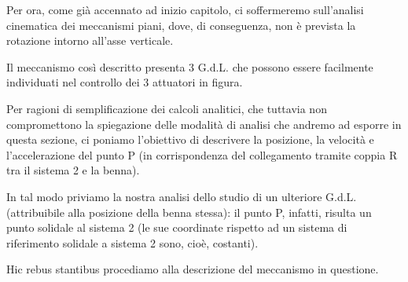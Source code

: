 			Per ora, come già accennato ad inizio capitolo, ci soffermeremo sull'analisi cinematica dei meccanismi piani, dove, di conseguenza, non è prevista la rotazione intorno all'asse verticale.
			
			Il meccanismo così descritto presenta 3 G.d.L. che possono essere facilmente individuati nel controllo dei 3 attuatori in figura.
			
			Per ragioni di semplificazione dei calcoli analitici, che tuttavia non compromettono la spiegazione delle modalità di analisi che andremo ad esporre in questa sezione, ci poniamo l'obiettivo di descrivere la posizione, la velocità e l'accelerazione del punto P (in corrispondenza del collegamento tramite coppia R tra il sistema 2 e la benna).
			 
			 In tal modo priviamo la nostra analisi dello studio di un ulteriore G.d.L. (attribuibile alla posizione della benna stessa): il punto P, infatti, risulta un punto solidale al sistema 2 (le sue coordinate rispetto ad un sistema di riferimento solidale a sistema 2 sono, cioè, costanti).
			 
			 Hic rebus stantibus procediamo alla descrizione del meccanismo in questione.
			 
